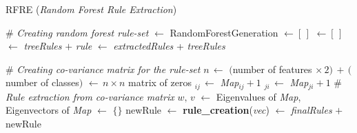 \documentclass[12pt]{article}
\begin{document}
%
%

\begin{algorithm}
\caption{RFRE (\textit{Random Forest Rule Extraction})}\label{alg:RFRE}
\begin{algorithmic}
\State \# {\sl Creating random forest rule-set}
 $\gets$ RandomForestGeneration		
 $\gets [\, ]$
	  $\gets [\,]$
		 $\gets$ {\sl treeRules} $+$ {\sl rule} 
	\EndFor
	 $\gets$ {\sl extractedRules} + {\sl treeRules}
\EndFor

\State
\State \# {\sl Creating co-variance matrix for the rule-set}
\State $n \, \gets$ $($number of features $\times \, 2) \, + \,($number of classes$)$ 
 $\gets \, n\times n$ matrix of zeros
		$_{ij} \, \gets$  {\sl Map}$_{ij} + 1$
		$_{ji} \, \gets$  {\sl Map}$_{ji} + 1$
	\EndIf
\EndFor
\State 
\State \# {\sl Rule extraction from co-variance matrix}
\State $w, \, v$ $\gets$ Eigenvalues of {\sl Map}, Eigenvectors of {\sl Map }
 $\gets$ $\{\}$
	\State newRule $\gets $ \textbf{rule\_creation}({\sl  vec})
	 $\gets$ {\sl finalRules} $+$ newRule
	\EndIf
\EndFor
\State {}
\end{algorithmic}
\end{algorithm}
\end{document}
